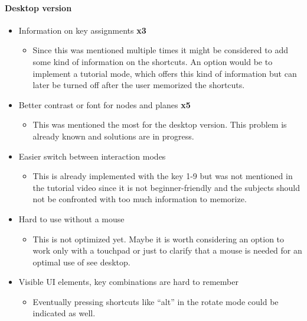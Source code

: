 \paragraph{Desktop version}
\begin{itemize}
  \item Information on key assignments \textbf{x3}
  \begin{itemize}
    \item Since this was mentioned multiple times it might be considered to add some kind of information on the \glspl{shortcut}. An option would be to implement a tutorial mode, which offers this kind of information but can later be turned off after the user memorized the \glspl{shortcut}.
  \end{itemize}
  \item Better contrast or font for nodes and \glspl{plane} \textbf{x5}
  \begin{itemize}
    \item This was mentioned the most for the desktop version. This problem is already known and solutions are in progress. 
  \end{itemize}
  \item Easier switch between interaction modes
  \begin{itemize}
    \item This is already implemented with the key 1-9 but was not mentioned in the tutorial video since it is not beginner-friendly and the subjects should not be confronted with too much information to memorize.
  \end{itemize}
  \item Hard to use without a mouse
  \begin{itemize}
    \item This is not optimized yet. Maybe it is worth considering an option to work only with a touchpad or just to clarify that a mouse is needed for an optimal use of \gls{see} desktop.
  \end{itemize}
  \item Visible UI elements, key combinations are hard to remember
  \begin{itemize}
    \item Eventually pressing \glspl{shortcut} like \enquote{alt} in the rotate mode could be indicated as well. 
  \end{itemize}
\end{itemize} 
